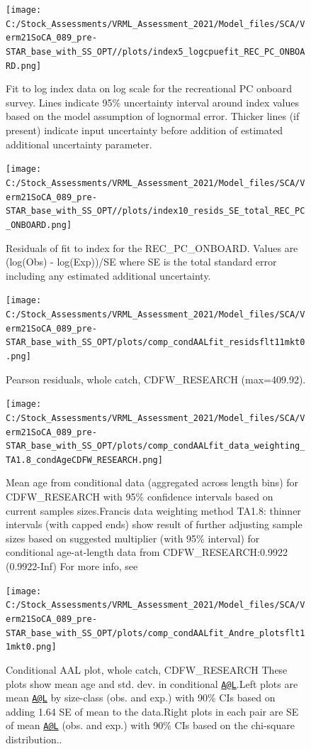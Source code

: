 \documentclass[
  english,
  a4paper,
]{article}
\begin{document}
\begin{figure}
\centering
\texttt{[image: C:/Stock\_Assessments/VRML\_Assessment\_2021/Model\_files/SCA/Verm21SoCA\_089\_pre-STAR\_base\_with\_SS\_OPT//plots/index5\_logcpuefit\_REC\_PC\_ONBOARD.png]}
\caption{Fit to log index data on log scale for the recreational PC onboard survey. Lines indicate 95\% uncertainty interval around index values based on the model assumption of lognormal error. Thicker lines (if present) indicate input uncertainty before addition of estimated additional uncertainty parameter.\label{fig:log-cpue-REC-PC-ONBOARD}}
\end{figure}

\begin{figure}
\centering
\texttt{[image: C:/Stock\_Assessments/VRML\_Assessment\_2021/Model\_files/SCA/Verm21SoCA\_089\_pre-STAR\_base\_with\_SS\_OPT//plots/index10\_resids\_SE\_total\_REC\_PC\_ONBOARD.png]}
\caption{Residuals of fit to index for the REC\_PC\_ONBOARD. Values are (log(Obs) - log(Exp))/SE where SE is the total standard error including any estimated additional uncertainty.\label{fig:cpue-resid-REC-PC-ONBOARD}}
\end{figure}

\FloatBarrier

\begin{figure}
\centering
\texttt{[image: C:/Stock\_Assessments/VRML\_Assessment\_2021/Model\_files/SCA/Verm21SoCA\_089\_pre-STAR\_base\_with\_SS\_OPT/plots/comp\_condAALfit\_residsflt11mkt0.png]}
\caption{Pearson residuals, whole catch, CDFW\_RESEARCH (max=409.92).\label{fig:comp_condAALfit_residsflt11mkt0}}
\end{figure}

\begin{figure}
\centering
\texttt{[image: C:/Stock\_Assessments/VRML\_Assessment\_2021/Model\_files/SCA/Verm21SoCA\_089\_pre-STAR\_base\_with\_SS\_OPT/plots/comp\_condAALfit\_data\_weighting\_TA1.8\_condAgeCDFW\_RESEARCH.png]}
\caption{Mean age from conditional data (aggregated across length bins) for CDFW\_RESEARCH with 95\% confidence intervals based on current samples sizes.Francis data weighting method TA1.8: thinner intervals (with capped ends) show result of further adjusting sample sizes based on suggested multiplier (with 95\% interval) for conditional age-at-length data from CDFW\_RESEARCH:0.9922 (0.9922-Inf) For more info, see}
\end{figure}

\begin{figure}
\centering
\texttt{[image: C:/Stock\_Assessments/VRML\_Assessment\_2021/Model\_files/SCA/Verm21SoCA\_089\_pre-STAR\_base\_with\_SS\_OPT/plots/comp\_condAALfit\_Andre\_plotsflt11mkt0.png]}
\caption{Conditional AAL plot, whole catch, CDFW\_RESEARCH
These plots show mean age and std. dev. in conditional \href{mailto:A@L}{\nolinkurl{A@L}}.Left plots are mean \href{mailto:A@L}{\nolinkurl{A@L}} by size-class (obs. and exp.) with 90\% CIs based on adding 1.64 SE of mean to the data.Right plots in each pair are SE of mean \href{mailto:A@L}{\nolinkurl{A@L}} (obs. and exp.) with 90\% CIs based on the chi-square distribution..\label{fig:comp_condAALfit_Andre_plotsflt11mkt0}}
\end{figure}
\end{document}
